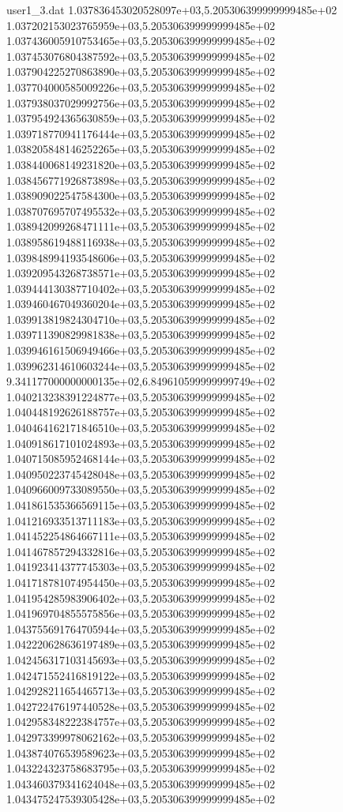 \begin{filecontents}{user1_3.dat}
1.037836453020528097e+03,5.205306399999999485e+02
1.037202153023765959e+03,5.205306399999999485e+02
1.037436005910753465e+03,5.205306399999999485e+02
1.037453076804387592e+03,5.205306399999999485e+02
1.037904225270863890e+03,5.205306399999999485e+02
1.037704000585009226e+03,5.205306399999999485e+02
1.037938037029992756e+03,5.205306399999999485e+02
1.037954924365630859e+03,5.205306399999999485e+02
1.039718770941176444e+03,5.205306399999999485e+02
1.038205848146252265e+03,5.205306399999999485e+02
1.038440068149231820e+03,5.205306399999999485e+02
1.038456771926873898e+03,5.205306399999999485e+02
1.038909022547584300e+03,5.205306399999999485e+02
1.038707695707495532e+03,5.205306399999999485e+02
1.038942099268471111e+03,5.205306399999999485e+02
1.038958619488116938e+03,5.205306399999999485e+02
1.039848994193548606e+03,5.205306399999999485e+02
1.039209543268738571e+03,5.205306399999999485e+02
1.039444130387710402e+03,5.205306399999999485e+02
1.039460467049360204e+03,5.205306399999999485e+02
1.039913819824304710e+03,5.205306399999999485e+02
1.039711390829981838e+03,5.205306399999999485e+02
1.039946161506949466e+03,5.205306399999999485e+02
1.039962314610603244e+03,5.205306399999999485e+02
9.341177000000000135e+02,6.849610599999999749e+02
1.040213238391224877e+03,5.205306399999999485e+02
1.040448192626188757e+03,5.205306399999999485e+02
1.040464162171846510e+03,5.205306399999999485e+02
1.040918617101024893e+03,5.205306399999999485e+02
1.040715085952468144e+03,5.205306399999999485e+02
1.040950223745428048e+03,5.205306399999999485e+02
1.040966009733089550e+03,5.205306399999999485e+02
1.041861535366569115e+03,5.205306399999999485e+02
1.041216933513711183e+03,5.205306399999999485e+02
1.041452254864667111e+03,5.205306399999999485e+02
1.041467857294332816e+03,5.205306399999999485e+02
1.041923414377745303e+03,5.205306399999999485e+02
1.041718781074954450e+03,5.205306399999999485e+02
1.041954285983906402e+03,5.205306399999999485e+02
1.041969704855575856e+03,5.205306399999999485e+02
1.043755691764705944e+03,5.205306399999999485e+02
1.042220628636197489e+03,5.205306399999999485e+02
1.042456317103145693e+03,5.205306399999999485e+02
1.042471552416819122e+03,5.205306399999999485e+02
1.042928211654465713e+03,5.205306399999999485e+02
1.042722476197440528e+03,5.205306399999999485e+02
1.042958348222384757e+03,5.205306399999999485e+02
1.042973399978062162e+03,5.205306399999999485e+02
1.043874076539589623e+03,5.205306399999999485e+02
1.043224323758683795e+03,5.205306399999999485e+02
1.043460379341624048e+03,5.205306399999999485e+02
1.043475247539305428e+03,5.205306399999999485e+02

\end{filecontents}
